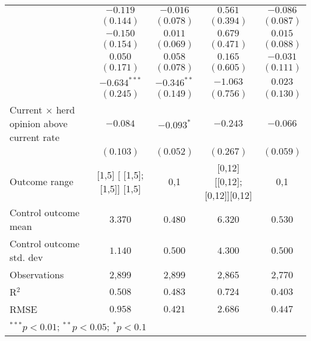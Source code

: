\begin{table}
\begin{center}
\begin{tabular}{l c c c c}
                                                 & $-0.119$                     & $-0.016$       & $0.561$                       & $-0.086$       \\
                                                 & $(0.144)$                    & $(0.078)$      & $(0.394)$                     & $(0.087)$      \\
                                                 & $-0.150$                     & $0.011$        & $0.679$                       & $0.015$        \\
                                                 & $(0.154)$                    & $(0.069)$      & $(0.471)$                     & $(0.088)$      \\
                                                 & $0.050$                      & $0.058$        & $0.165$                       & $-0.031$       \\
                                                 & $(0.171)$                    & $(0.078)$      & $(0.605)$                     & $(0.111)$      \\
                                                 & $-0.634^{***}$               & $-0.346^{**}$  & $-1.063$                      & $0.023$        \\
                                                 & $(0.245)$                    & $(0.149)$      & $(0.756)$                     & $(0.130)$      \\
Current $\times$ herd opinion above current rate & $-0.084$                     & $-0.093^{*}$   & $-0.243$                      & $-0.066$       \\
                                                 & $(0.103)$                    & $(0.052)$      & $(0.267)$                     & $(0.059)$      \\
\hline
Outcome range                                    & [1,5] [ [1,5];  [1,5]] [1,5] & {0,1}          & [0,12] [[0,12]; [0,12]][0,12] & {0,1}          \\
Control outcome mean                             & $3.370$                      & $0.480$        & $6.320$                       & $0.530$        \\
Control outcome std. dev                         & $1.140$                      & $0.500$        & $4.300$                       & $0.500$        \\
Observations                                     & 2,899                        & 2,899          & 2,865                         & 2,770          \\
R$^{2}$                                          & $0.508$                      & $0.483$        & $0.724$                       & $0.403$        \\
RMSE                                             & $0.958$                      & $0.421$        & $2.686$                       & $0.447$        \\
\hline
\multicolumn{5}{l}{\scriptsize{$^{***}p<0.01$; $^{**}p<0.05$; $^{*}p<0.1$}}
\end{tabular}
\caption{}
\label{table:SI_table30_currentherdint_rake}
\end{center}
\end{table}
